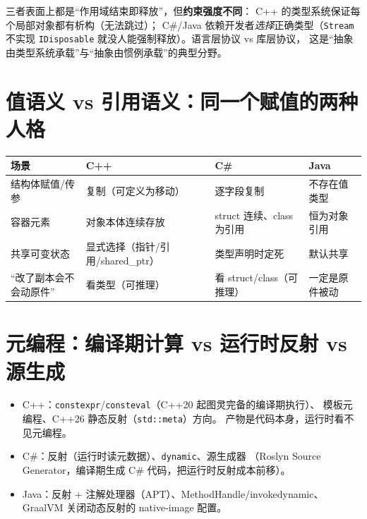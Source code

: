 \documentclass[12pt,a4paper,fontset=fandol]{ctexbook}
\begin{document}
\begin{note}[title=层级视角下的生命周期语法]
三者表面上都是``作用域结束即释放''，但\textbf{约束强度不同}：
C++ 的类型系统保证每个局部对象都有析构（无法跳过）；
C\#/Java 依赖开发者\emph{选择}正确类型（\texttt{Stream} 不实现
\texttt{IDisposable} 就没人能强制释放）。语言层协议 vs 库层协议，
这是``抽象由类型系统承载''与``抽象由惯例承载''的典型分野。
\end{note}

\section{值语义 vs 引用语义：同一个赋值的两种人格}

\begin{longtable}{@{}>{\raggedright\arraybackslash}p{}>{\raggedright\arraybackslash}p{}>{\raggedright\arraybackslash}p{}>{\raggedright\arraybackslash}p{}@{}}
\toprule
\textbf{场景} & \textbf{C++} & \textbf{C\#} & \textbf{Java} \\
\midrule
结构体赋值/传参 & 复制（可定义为移动） & 逐字段复制 & 不存在值类型 \\
\addlinespace
容器元素 & 对象本体连续存放 & struct 连续、class 为引用 & 恒为对象引用 \\
\addlinespace
共享可变状态 & 显式选择（指针/引用/shared\_ptr） & 类型声明时定死 & 默认共享 \\
\addlinespace
``改了副本会不会动原件'' & 看类型（可推理） & 看 struct/class（可推理） & 一定是原件被动 \\
\bottomrule
\end{longtable}

\section{元编程：编译期计算 vs 运行时反射 vs 源生成}

\begin{itemize}
  \item C++：\texttt{constexpr}/\allowbreak{}\texttt{consteval}（C++20 起图灵完备的编译期执行）、
        模板元编程、C++26 静态反射（\texttt{std::meta}）方向。
        产物是代码本身，运行时看不见元编程。
  \item C\#：反射（运行时读元数据）、\texttt{dynamic}、源生成器
        （Roslyn Source Generator，编译期生成 C\# 代码，把运行时反射成本前移）。
  \item Java：反射 + 注解处理器（APT）、MethodHandle/invokedynamic、
        GraalVM 关闭动态反射的 native-image 配置。
\end{itemize}
\end{document}
